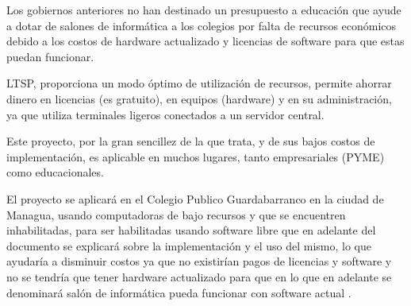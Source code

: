 \documentclass[12pt]{report}
\begin{document}
Los gobiernos anteriores no han destinado un presupuesto a educaci\'on que ayude a dotar de salones de inform\'atica a los colegios por falta de 
recursos econ\'omicos debido a los costos de hardware actualizado y licencias de software para que estas puedan funcionar.

LTSP, proporciona un modo \'optimo de utilización de recursos, permite ahorrar dinero en licencias (es gratuito), en equipos 
(hardware) y en su administraci\'on, ya que utiliza terminales ligeros conectados a un servidor central. 
 
Este proyecto, por la gran sencillez de la que trata, y de sus bajos costos de implementaci\'on, es aplicable en muchos lugares, tanto empresariales 
(PYME) como educacionales. 

El proyecto se aplicar\'a en el Colegio Publico Guardabarranco en la ciudad de Managua, usando computadoras de bajo recursos y que se encuentren 
inhabilitadas, para ser habilitadas usando software libre que en adelante del documento se explicar\'a sobre la implementaci\'on y el uso del mismo, 
lo que ayudar\'ia a disminuir costos ya que no existir\'ian pagos de licencias y software y no se tendr\'ia que tener hardware actualizado para que 
en lo que en adelante se denominar\'a sal\'on de inform\'atica pueda funcionar con software actual .
\end{document}
